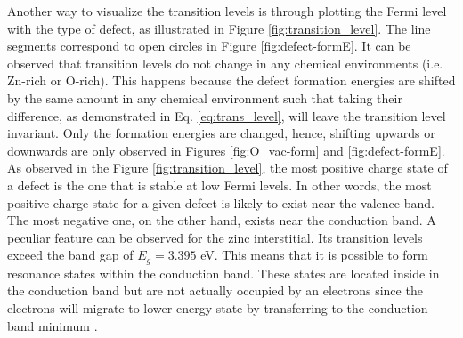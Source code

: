 Another way to visualize the transition levels is through plotting the Fermi level with the type of defect, as illustrated in Figure \ref{fig:transition_level}. The line segments correspond to open circles in Figure \ref{fig:defect-formE}. It can be observed that transition levels do not change in any chemical environments (i.e. Zn-rich or O-rich). This happens because the defect formation energies are shifted by the same amount  in any chemical environment such that taking their difference, as demonstrated in Eq. \eqref{eq:trans_level}, will leave the transition level invariant. Only the formation energies are changed, hence, shifting upwards or downwards are only observed in Figures \ref{fig:O_vac-form} and \ref{fig:defect-formE}. As observed in the Figure \ref{fig:transition_level}, the most positive charge state of a defect is the one that is stable at low Fermi levels. In other words, the most positive charge state for a given defect is likely to exist near the valence band. The most negative one, on the other hand, exists near the conduction band. A peculiar feature can be observed for the zinc interstitial. Its transition levels exceed the band gap of $E_g = 3.395$ eV. This means that it is possible to form resonance states within the conduction band. These states are located inside in the conduction band but are not actually occupied by an electrons since the electrons will migrate to lower energy state by transferring to the conduction band minimum \citep{Freysoldt2014}. 


